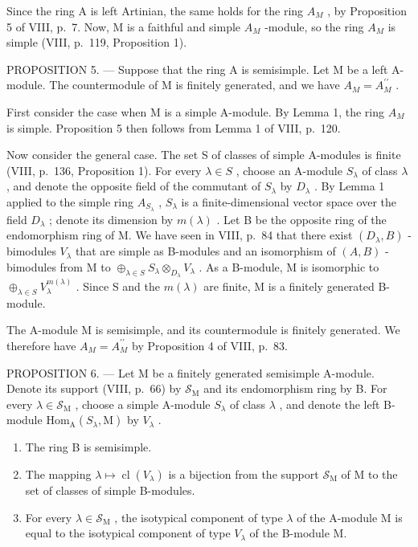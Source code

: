 Since the ring A is left Artinian, the same holds for the ring \(A_{M}\) , by Proposition 5 of VIII, p.~7. Now, M is a faithful and simple \(A_{M}\) -module, so the ring \(A_{M}\) is simple (VIII, p.~119, Proposition 1).

PROPOSITION 5. --- Suppose that the ring A is semisimple. Let M be a left A-module. The countermodule of M is finitely generated, and we have \(A_{M} = A_{M}^{\prime\prime}\) .

First consider the case when M is a simple A-module. By Lemma 1, the ring \(A_{M}\) is simple. Proposition 5 then follows from Lemma 1 of VIII, p.~120.

Now consider the general case. The set S of classes of simple A-modules is finite (VIII, p.~136, Proposition 1). For every \(\lambda \in S\) , choose an A-module \(S_{\lambda}\) of class \(\lambda\) , and denote the opposite field of the commutant of \(S_{\lambda}\) by \(D_{\lambda}\) . By Lemma 1 applied to the simple ring \(A_{S_{\lambda}}\) , \(S_{\lambda}\) is a finite-dimensional vector space over the field \(D_{\lambda}\) ; denote its dimension by \(m(\lambda)\) . Let B be the opposite ring of the endomorphism ring of M. We have seen in VIII, p.~84 that there exist \((D_{\lambda}, B)\) -bimodules \(V_{\lambda}\) that are simple as B-modules and an isomorphism of \((A, B)\) -bimodules from M to \(\oplus_{\lambda \in S} S_{\lambda} \otimes_{D_{\lambda}} V_{\lambda}\) . As a B-module, M is isomorphic to \(\oplus_{\lambda \in S} V_{\lambda}^{m(\lambda)}\) . Since S and the \(m(\lambda)\) are finite, M is a finitely generated B-module.

The A-module M is semisimple, and its countermodule is finitely generated. We therefore have \(A_{M} = A_{M}^{\prime\prime}\) by Proposition 4 of VIII, p.~83.

PROPOSITION 6. --- Let M be a finitely generated semisimple A-module. Denote its support (VIII, p.~66) by \(\mathcal{S}_{\mathrm{M}}\) and its endomorphism ring by B. For every \(\lambda \in \mathcal{S}_{\mathrm{M}}\) , choose a simple A-module \(S_{\lambda}\) of class \(\lambda\) , and denote the left B-module \(\mathrm{Hom}_{\mathrm{A}}(S_{\lambda}, \mathrm{M})\) by \(V_{\lambda}\) .

\begin{enumerate}
\def\labelenumi{\alph{enumi})}
\item
  The ring B is semisimple.
\item
  The mapping \(\lambda \mapsto \operatorname{cl}(V_{\lambda})\) is a bijection from the support \(\mathcal{S}_{\mathrm{M}}\) of M to the set of classes of simple B-modules.
\item
  For every \(\lambda \in \mathcal{S}_{\mathrm{M}}\) , the isotypical component of type \(\lambda\) of the A-module M is equal to the isotypical component of type \(V_{\lambda}\) of the B-module M.
\end{enumerate}

